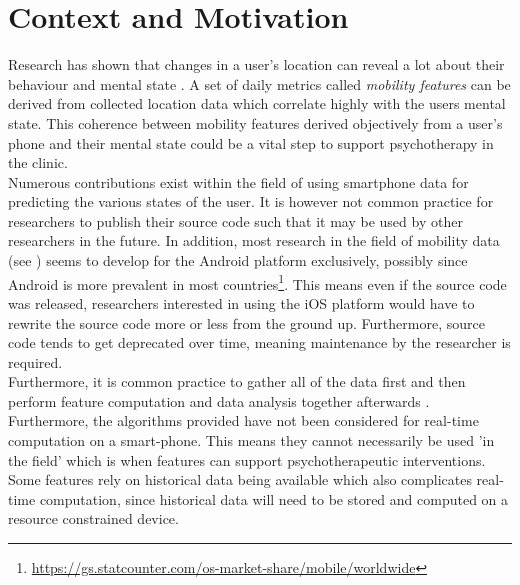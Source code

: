 \section{Context and Motivation}



Research has shown that changes in a user's location can reveal a lot about their behaviour and mental state \cite{Saeb2015, Canzian2015, palmius2017, }. A set of daily metrics called \textit{mobility features} can be derived from collected location data which correlate highly with the users mental state. This coherence between mobility features derived objectively from a user's phone and their mental state could be a vital step to support psychotherapy in the clinic.\\

Numerous contributions exist within the field of using smartphone data for predicting the various states of the user. It is however not common practice for researchers to publish their source code such that it may be used by other researchers in the future. In addition, most research in the field of mobility data (see \cite{Saeb2015,  palmius2017, Canzian2015, extraction-of-behavioural-features}) seems to develop for the Android platform exclusively, possibly since Android is more prevalent in most countries\footnote{\url{https://gs.statcounter.com/os-market-share/mobile/worldwide}}. This means even if the source code was released, researchers interested in using the iOS platform would have to rewrite the source code more or less from the ground up. Furthermore, source code tends to get deprecated over time, meaning maintenance by the researcher is required. \\

Furthermore, it is common practice to gather all of the data first and then perform feature computation and data analysis together afterwards \cite{Saeb2015, saeb2016, sparse-location-2014, extraction-of-behavioural-features}. Furthermore, the algorithms provided have not been considered for real-time computation on a smart-phone. This means they cannot necessarily be used 'in the field' which is when features can support psychotherapeutic interventions. Some features rely on historical data being available which also complicates real-time computation, since historical data will need to be stored and computed on a resource constrained device.\\


